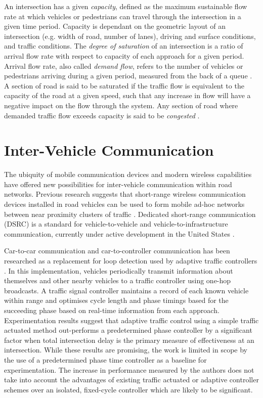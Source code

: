 \begin{appendices}
An intersection has a given \emph{capacity}, defined as the maximum sustainable flow rate at which vehicles or pedestrians can travel through the intersection in a given time period. Capacity is dependant on the geometric layout of an intersection (e.g. width of road, number of lanes), driving and surface conditions, and traffic conditions. The \emph{degree of saturation} of an intersection is a ratio of arrival flow rate with respect to capacity of each approach for a given period. Arrival flow rate, also called \emph{demand flow}, refers to the number of vehicles or pedestrians arriving during a given period, measured from the back of a queue \cite{sidraglossary}. A section of road is said to be saturated if the traffic flow is equivalent to the capacity of the road at a given speed, such that any increase in flow will have a negative impact on the flow through the system. Any section of road where demanded traffic flow exceeds capacity is said to be \emph{congested} \cite{wallis2013costs}.

\chapter{Inter-Vehicle Communication}
\label{appendix:inter-vehicle-comms}

The ubiquity of mobile communication devices and modern wireless capabilities have offered new possibilities for inter-vehicle communication within road networks. Previous research suggests that short-range wireless communication devices installed in road vehicles can be used to form mobile ad-hoc networks between near proximity clusters of traffic \cite{adaptive2007grad,nadeem2004trafficview,yang2004vehicle}. Dedicated short-range communication (DSRC) is a standard for vehicle-to-vehicle and vehicle-to-infrastructure communication, currently under active development in the United States \cite{dsrc2011}.

Car-to-car communication and car-to-controller communication has been researched as a replacement for loop detection used by adaptive traffic controllers \cite{adaptive2007grad}. In this implementation, vehicles periodically transmit information about themselves and other nearby vehicles to a traffic controller using one-hop broadcasts. A traffic signal controller maintains a record of each known vehicle within range and optimises cycle length and phase timings based for the succeeding phase based on real-time information from each approach. Experimentation results suggest that adaptive traffic control using a simple traffic actuated method out-performs a predetermined phase controller by a significant factor when total intersection delay is the primary measure of effectiveness at an intersection. While these results are promising, the work is limited in scope by the use of a predetermined phase time controller as a baseline for experimentation. The increase in performance measured by the authors does not take into account the advantages of existing traffic actuated or adaptive controller schemes over an isolated, fixed-cycle controller which are likely to be significant. 


\end{appendices}
